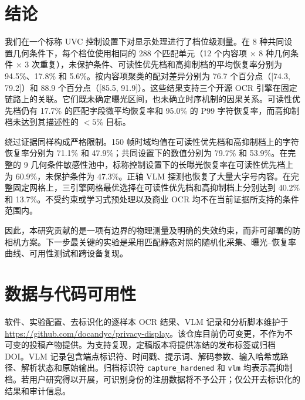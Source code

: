 \section{结论}
\label{sec:conclusion}

我们在一个标称 UVC 控制设置下对显示处理进行了档位级测量。在 8 种共同设置几何条件下，每个档位使用相同的 288 个匹配单元（12 个内容项 $\times$ 8 种几何条件 $\times$ 3 次重复），未保护条件、可读性优先档和高抑制档的平均恢复率分别为 94.5\%、17.8\% 和 5.6\%。按内容项聚类的配对差异分别为 76.7 个百分点（[74.3, 79.2]）和 88.9 个百分点（[85.5, 91.9]）。这些结果支持三个开源 OCR 引擎在固定链路上的关联。它们既未确定曝光区间，也未确立时序机制的因果关系。可读性优先档仍有 17.7\% 的匹配字段微平均恢复率和 95.0\% 的 P99 字符恢复率，而高抑制档未达到其描述性的 $<5\%$ 目标。

绕过证据同样构成严格限制。150 帧时域均值在可读性优先档和高抑制档上的字符恢复率分别为 71.1\% 和 47.9\%；共同设置下的数值分别为 79.7\% 和 53.9\%。在完整的 9 几何条件敏感性池中，标称控制设置下的长曝光恢复率在可读性优先档上为 60.9\%，未保护条件为 47.3\%。正轴 VLM 探测也恢复了大量大字号内容。在完整固定网格上，三引擎网格最优选择在可读性优先档和高抑制档上分别达到 40.2\% 和 13.7\%。不受约束或学习式预处理以及商业 OCR 均不在当前证据所支持的条件范围内。

因此，本研究贡献的是一项有边界的物理测量及明确的失效约束，而非可部署的防相机方案。下一步最关键的实验是采用匹配静态对照的随机化采集、曝光--恢复率曲线、可用性测试和跨设备复现。

\section*{数据与代码可用性}

软件、实验配置、去标识化的逐样本 OCR 结果、VLM 记录和分析脚本维护于 \url{https://github.com/docandyc/privacy-display}。该仓库目前仍可变更，不作为不可变的投稿产物提供。为支持复现，定稿版本将提供冻结的发布标签或归档 DOI。VLM 记录包含端点标识符、时间戳、提示词、解码参数、输入哈希或路径、解析状态和原始输出。归档标识符 \texttt{capture\_hardened} 和 \texttt{vlm} 均表示高抑制档。若用户研究得以开展，可识别身份的注册数据将不予公开；仅公开去标识化的结果和审计信息。

